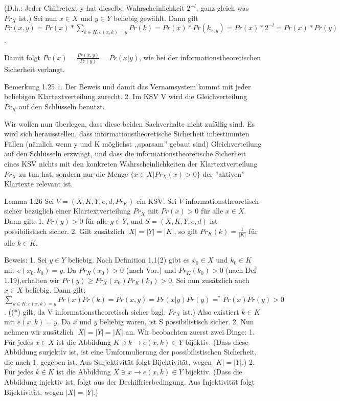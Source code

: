 \documentclass[a4paper]{article}
\begin{document}
\begin{multicols}{3}
(D.h.: Jeder Chiffretext y hat dieselbe Wahrscheinlichkeit $2^{-l}$, ganz gleich was $Pr_X$ ist.)
Sei nun $x\in X$ und $y\in Y$ beliebig gewählt. Dann gilt $Pr(x,y) = Pr(x)*\sum_{k\in K, e(x,k)=y} Pr(k) = Pr(x)*Pr(k_{x,y}) = Pr(x)* 2^{-l}= Pr(x)*Pr(y)$.

Damit folgt $Pr(x)=\frac{Pr(x,y)}{Pr(y)}= Pr(x|y)$, wie bei der informationstheoretischen Sicherheit verlangt.

Bemerkung 1.25
1. Der Beweis und damit das Vernamsystem kommt mit jeder beliebigen Klartextverteilung zurecht.
2. Im KSV V wird die Gleichverteilung $Pr_K$ auf den Schlüsseln benutzt.

Wir wollen nun überlegen, dass diese beiden Sachverhalte nicht zufällig sind.  Es wird sich herausstellen, dass informationstheoretische Sicherheit inbestimmten  Fällen (nämlich wenn y und K möglichst ,,sparsam'' gebaut sind) Gleichverteilung auf den Schlüsseln erzwingt, und dass die informationstheoretische Sicherheit eines KSV nichts mit den konkreten Wahrscheinlichkeiten der Klartextverteilung $Pr_X$ zu tun hat, sondern nur die Menge $\{x\in X|Pr_X(x)> 0\}$ der ''aktiven'' Klartexte relevant ist.

Lemma 1.26 Sei $V=(X,K,Y,e,d,Pr_K)$ ein KSV. Sei $V$ informationstheoretisch sicher bezüglich einer Klartextverteilung $Pr_X$ mit $Pr(x)>0$ für alle $x\in X$. Dann gilt:
1. $Pr(y)>0$ für alle $y\in Y$, und $S=(X,K,Y,e,d)$ ist possibilistisch sicher.
2. Gilt zusätzlich $|X|=|Y|=|K|$, so gilt $Pr_K(k)=\frac{1}{|K|}$ für alle $k\in K$.

Beweis: 
1. Sei $y\in Y$ beliebig. Nach Definition 1.1(2) gibt es $x_0\in X$ und $k_0\in K$ mit $e(x_0,k_0)=y$. Da $Pr_X(x_0)>0$ (nach Vor.) und $Pr_K(k_0)>0$ (nach Def 1.19),erhalten wir $Pr(y)\geq Pr_X(x_0)Pr_K(k_0)>0$. Sei nun zusätzlich auch $x\in X$ beliebig. Dann gilt: $\sum_{k\in K:e(x,k)=y} Pr(x)Pr(k)= Pr(x,y)= Pr(x|y)Pr(y)=^* Pr(x)Pr(y)> 0$. ((*) gilt, da V informationstheoretisch sicher bzgl. $Pr_X$ ist.) Also existiert $k\in K$ mit $e(x,k)=y$. Da $x$ und $y$ beliebig waren, ist S possibilistisch sicher.
2. Nun nehmen wir zusätzlich $|X|=|Y|=|K|$ an. Wir beobachten zuerst zwei Dinge:
    1. Für jedes $x\in X$ ist die Abbildung $K\ni k \rightarrow e(x,k)\in Y$  bijektiv. (Dass diese Abbildung surjektiv ist, ist eine Umformulierung der possibilistischen Sicherheit, die nach 1. gegeben ist. Aus Surjektivität folgt Bijektivität, wegen $|K|=|Y|$.)
    2. Für jedes $k\in K$ ist die Abbildung $X\ni x \rightarrow e(x,k)\in Y$ bijektiv. (Dass die Abbildung injektiv ist, folgt aus der Dechiffrierbedingung. Aus Injektivität folgt Bijektivität, wegen $|X|=|Y|$.)


\end{multicols}
\end{document}
